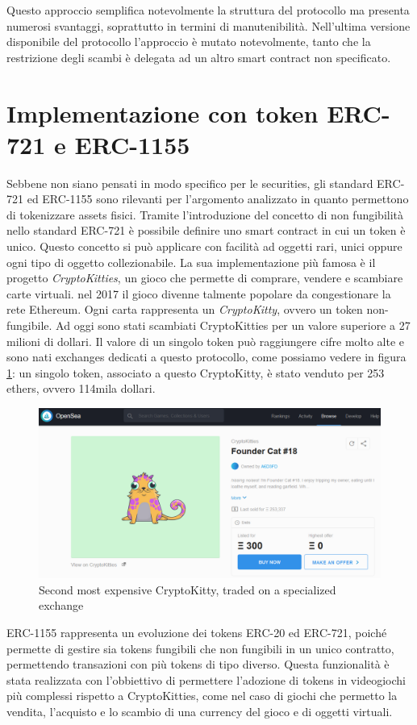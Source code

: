Questo approccio semplifica notevolmente la struttura del protocollo ma presenta numerosi svantaggi, soprattutto in termini di manutenibilità. Nell'ultima versione disponibile del protocollo l'approccio è mutato notevolmente, tanto che la restrizione degli scambi è delegata ad un altro smart contract non specificato. 
\section{Implementazione con token ERC-721 e ERC-1155}
Sebbene non siano pensati in modo specifico per le securities, gli standard ERC-721 ed ERC-1155 sono rilevanti per l'argomento analizzato in quanto permettono di tokenizzare assets fisici. Tramite l'introduzione del concetto di non fungibilità nello standard ERC-721 è possibile definire uno smart contract in cui un token è unico. Questo concetto si può applicare con facilità ad oggetti rari, unici oppure ogni tipo di oggetto collezionabile. La sua implementazione più famosa è il progetto \textit{CryptoKitties}, un gioco che permette di comprare, vendere e scambiare carte virtuali. nel 2017 il gioco divenne talmente popolare da congestionare la rete Ethereum. Ogni carta rappresenta un \textit{CryptoKitty}, ovvero un token  non-fungibile. Ad oggi sono stati scambiati CryptoKitties per un valore superiore a 27 milioni di dollari. Il valore di un singolo token può raggiungere cifre molto alte e sono nati exchanges dedicati a questo protocollo, come possiamo vedere in figura \ref{fig:kitty}: un singolo token, associato a questo CryptoKitty, è stato venduto per 253 ethers, ovvero 114mila dollari. 
\begin{figure}[H]
  \includegraphics[width=\linewidth]{kitty.png}
  \caption{Second most expensive CryptoKitty, traded on a specialized exchange}
  \label{fig:kitty}
\end{figure}

ERC-1155 rappresenta un evoluzione dei tokens ERC-20 ed ERC-721, poiché permette di gestire sia tokens fungibili che non fungibili in un unico contratto, permettendo transazioni con più tokens di tipo diverso. Questa funzionalità è stata realizzata con l'obbiettivo di permettere l'adozione di tokens in videogiochi più complessi rispetto a CryptoKitties, come nel caso di giochi che permetto la vendita, l'acquisto e lo scambio di una currency del gioco e di oggetti virtuali. 

